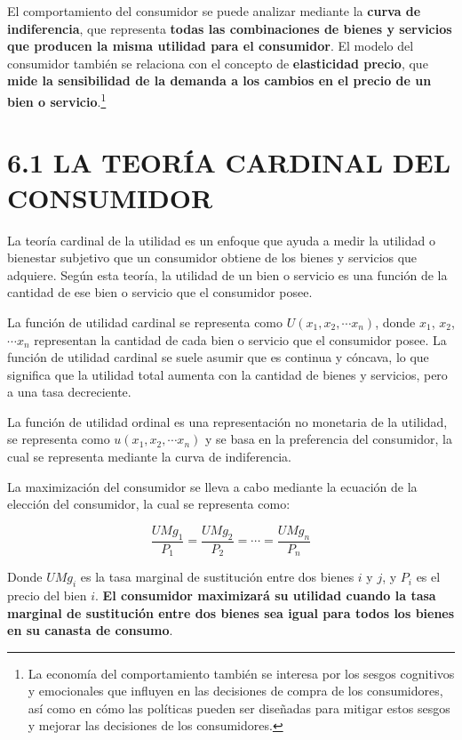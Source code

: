 \documentclass[
  spanish,
  12pt,
]{book}
\begin{document}
El comportamiento del consumidor se puede analizar mediante la
\textbf{curva de indiferencia}, que representa \textbf{todas las
combinaciones de bienes y servicios que producen la misma utilidad para
el consumidor}. El modelo del consumidor también se relaciona con el
concepto de \textbf{elasticidad precio}, que \textbf{mide la
sensibilidad de la demanda a los cambios en el precio de un bien o
servicio}.\footnote{La economía del comportamiento también se interesa
  por los sesgos cognitivos y emocionales que influyen en las decisiones
  de compra de los consumidores, así como en cómo las políticas pueden
  ser diseñadas para mitigar estos sesgos y mejorar las decisiones de
  los consumidores.}

\newpage

\section{6.1 LA TEORÍA CARDINAL DEL
CONSUMIDOR}\label{la-teoruxeda-cardinal-del-consumidor}

La teoría cardinal de la utilidad es un enfoque que ayuda a medir la
utilidad o bienestar subjetivo que un consumidor obtiene de los bienes y
servicios que adquiere. Según esta teoría, la utilidad de un bien o
servicio es una función de la cantidad de ese bien o servicio que el
consumidor posee.

La función de utilidad cardinal se representa como
\(U(x_{1}, x_{2},\cdots{x_{n}})\), donde \(x_{1}\), \(x_{2}\),
\(\cdots{x_{n}}\) representan la cantidad de cada bien o servicio que el
consumidor posee. La función de utilidad cardinal se suele asumir que es
continua y cóncava, lo que significa que la utilidad total aumenta con
la cantidad de bienes y servicios, pero a una tasa decreciente.

La función de utilidad ordinal es una representación no monetaria de la
utilidad, se representa como \(u(x_{1}, x_{2}, \cdots{x_{n}})\) y se
basa en la preferencia del consumidor, la cual se representa mediante la
curva de indiferencia.

La maximización del consumidor se lleva a cabo mediante la ecuación de
la elección del consumidor, la cual se representa como:

\begin{equation}
\frac{UMg_{1}}{P_{1}} = \frac{UMg_{2}}{P_{2}} = \cdots{=\frac{UMg_{n}}{P_{n}}}
\end{equation}

Donde \(UMg_{i}\) es la tasa marginal de sustitución entre dos bienes
\(i\) y \(j\), y \(P_{i}\) es el precio del bien \(i\). \textbf{El
consumidor maximizará su utilidad cuando la tasa marginal de sustitución
entre dos bienes sea igual para todos los bienes en su canasta de
consumo}.
\end{document}

